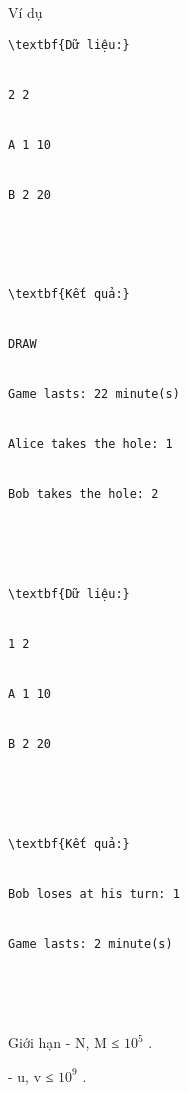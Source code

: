 Ví dụ
\begin{verbatim}
\textbf{Dữ liệu:}


2 2


A 1 10


B 2 20





\textbf{Kết quả:}


DRAW


Game lasts: 22 minute(s)


Alice takes the hole: 1


Bob takes the hole: 2





\textbf{Dữ liệu:}


1 2


A 1 10


B 2 20





\textbf{Kết quả:}


Bob loses at his turn: 1


Game lasts: 2 minute(s)





\end{verbatim}
Giới hạn
- N, M ≤ $10^{5}$   .   


   - u, v ≤ $10^{9}$   .